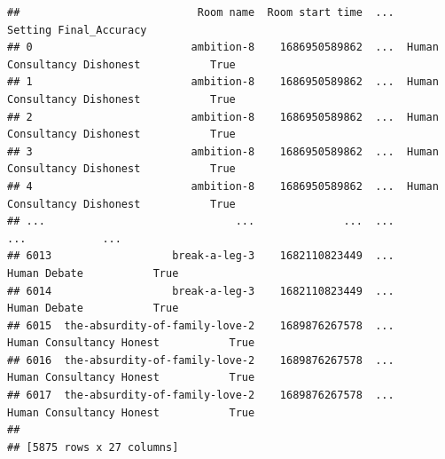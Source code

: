 \documentclass[
]{article}
\begin{document}
\begin{verbatim}
##                            Room name  Room start time  ...                      Setting Final_Accuracy
## 0                         ambition-8    1686950589862  ...  Human Consultancy Dishonest           True
## 1                         ambition-8    1686950589862  ...  Human Consultancy Dishonest           True
## 2                         ambition-8    1686950589862  ...  Human Consultancy Dishonest           True
## 3                         ambition-8    1686950589862  ...  Human Consultancy Dishonest           True
## 4                         ambition-8    1686950589862  ...  Human Consultancy Dishonest           True
## ...                              ...              ...  ...                          ...            ...
## 6013                   break-a-leg-3    1682110823449  ...                 Human Debate           True
## 6014                   break-a-leg-3    1682110823449  ...                 Human Debate           True
## 6015  the-absurdity-of-family-love-2    1689876267578  ...     Human Consultancy Honest           True
## 6016  the-absurdity-of-family-love-2    1689876267578  ...     Human Consultancy Honest           True
## 6017  the-absurdity-of-family-love-2    1689876267578  ...     Human Consultancy Honest           True
## 
## [5875 rows x 27 columns]
\end{verbatim}
\end{document}
